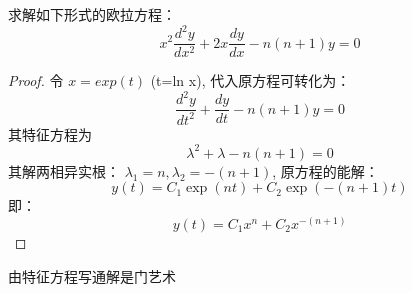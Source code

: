 \begin{example} %
	求解如下形式的欧拉方程：
	\begin{equation*}
		x^2 \frac{d^2 y}{d x^2} +2x \frac{d y}{d x} -n(n+1) y =0 
	\end{equation*}     
	
	\begin{proof} 
		令 $x=exp(t) $ (t=ln x), 代入原方程可转化为：
		\begin{equation*}
			\frac{d^2 y}{d t^2} + \frac{dy}{dt}-n(n+1) y =0 
		\end{equation*}     
		其特征方程为
		\begin{equation*}
		\lambda^2 +\lambda -n(n+1) =0	
		\end{equation*}    
	    其解两相异实根： $\lambda_1=n, \lambda_2= -(n+1)$,
		原方程的能解：
		\begin{equation*}
		y(t)=C_1 \exp (nt) +C_2 \exp (-(n+1) t)
		\end{equation*}    
	   即：
	  	\begin{equation*}
	  	y(t)=C_1 x^n +C_2 x^{-(n+1) }
	   \end{equation*}     
	\end{proof}
\end{example}

\begin{note}
	由特征方程写通解是门艺术
\end{note}

